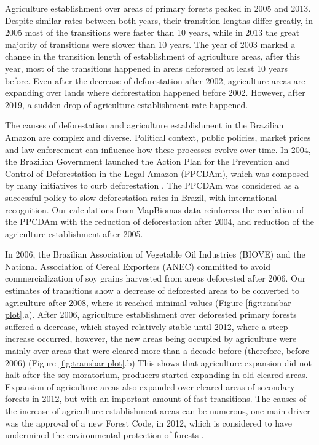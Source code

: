 \documentclass[essd, manuscript]{copernicus}
\begin{document}
Agriculture establishment over areas of primary forests peaked in 2005 and 2013.
Despite similar rates between both years, their transition lengths differ greatly, in 2005 most of the transitions were faster than 10 years, while in 2013 the great majority of transitions were slower than 10 years.
The year of 2003 marked a change in the transition length of establishment of agriculture areas, after this year, most of the transitions happened in areas deforested at least 10 years before.
Even after the decrease of deforestation after 2002, agriculture areas are expanding over lands where deforestation happened before 2002.
However, after 2019, a sudden drop of agriculture establishment rate happened.

The causes of deforestation and agriculture establishment in the Brazilian Amazon are complex and diverse.
Political context, public policies, market prices and law enforcement can influence how these processes evolve over time.
In 2004, the Brazilian Government launched the Action Plan for the Prevention and Control of Deforestation in the Legal Amazon (PPCDAm), which was composed by many initiatives to curb deforestation \citep{West2021}.
The PPCDAm was considered as a successful policy to slow deforestation rates in Brazil, with international recognition.
Our calculations from MapBiomas data reinforces the corelation of the PPCDAm with the reduction of deforestation after 2004, and reduction of the agriculture establishment after 2005.

In 2006, the Brazilian Association of Vegetable Oil Industries (BIOVE) and the National Association of Cereal Exporters (ANEC) committed to avoid commercialization of soy grains harvested from areas deforested after 2006.
Our estimates of transitions show a decrease of deforested areas to be converted to agriculture after 2008, where it reached minimal values (Figure \ref{fig:transbar-plot}.a).
After 2006, agriculture establishment over deforested primary forests suffered a decrease, which stayed relatively stable until 2012, where a steep increase occurred, however, the new areas being occupied by agriculture were mainly over areas that were cleared more than a decade before (therefore, before 2006) (Figure \ref{fig:transbar-plot}.b) This shows that agriculture expansion did not halt after the soy moratorium, producers started expanding in old cleared areas.
Expansion of agriculture areas also expanded over cleared areas of secondary forests in 2012, but with an important amount of fast transitions.
The causes of the increase of agriculture establishment areas can be numerous, one main driver was the approval of a new Forest Code, in 2012, which is considered to have undermined the environmental protection of forests \citep{Kroger2017, Pereira2019}.
\end{document}
